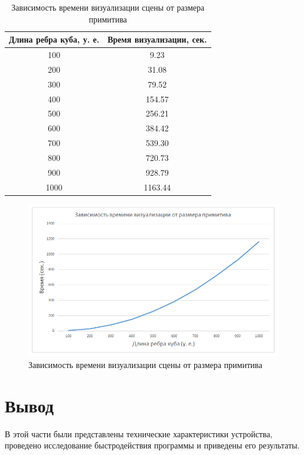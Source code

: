 \begin{table}[h]
	\small
	\centering
	\caption{Зависимость времени визуализации сцены от размера примитива}
	\begin{tabular}{|c|c|}
		\hline
		\textbf{Длина ребра куба, у. е.} & \textbf{Время визуализации, сек.} \\
		\hline
		100  & 9.23 \\
		200  & 31.08 \\
		300  & 79.52 \\
		400  & 154.57 \\
		500  & 256.21 \\
		600  & 384.42 \\
		700  & 539.30 \\
		800  & 720.73 \\
		900  & 928.79 \\
		1000 & 1163.44 \\
		\hline
	\end{tabular}
	\label{tbl:research3}
\end{table}

\begin{figure}[h] 
	\centering
	\includegraphics[width=1\textwidth]{images/research3.png}
	\caption{Зависимость времени визуализации сцены от размера примитива} 
	\label{fig:research3} 
\end{figure}

\section{Вывод}

В этой части были представлены технические характеристики устройства,
проведено исследование быстродействия программы и приведены его результаты.

\clearpage
